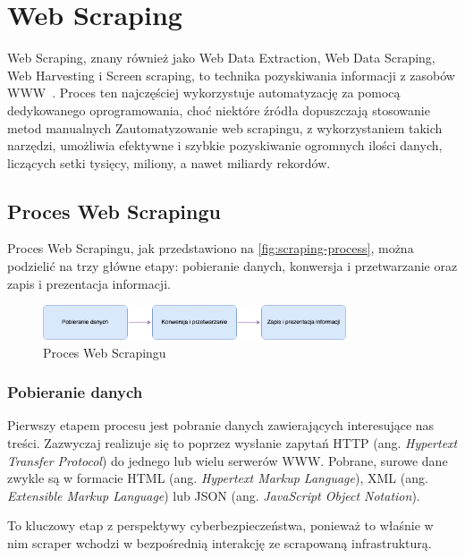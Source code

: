 \newpage


\section{Web Scraping}\label{sec:teoria}

Web Scraping, znany również jako Web Data Extraction, Web Data Scraping, Web Harvesting i Screen scraping, to technika pozyskiwania informacji z zasobów WWW~\cite{Zhao2017}.
Proces ten najczęściej wykorzystuje automatyzację za pomocą dedykowanego oprogramowania, choć niektóre źródła dopuszczają stosowanie metod manualnych\cite{applications-and-tools}
Zautomatyzowanie web scrapingu, z wykorzystaniem takich narzędzi, umożliwia efektywne i szybkie pozyskiwanie ogromnych ilości danych, liczących setki tysięcy, miliony, a nawet miliardy rekordów.

\subsection{Proces Web Scrapingu}\label{subsec:web-scraping-process}

Proces Web Scrapingu, jak przedstawiono na \autoref{fig:scraping-process}, można podzielić na trzy główne etapy: pobieranie danych, konwersja i przetwarzanie oraz zapis i prezentacja informacji\cite{persson}.

\begin{figure}[H]
    \centering
    \includegraphics[width=0.8\textwidth]{img/scraping-process}
    \caption{Proces Web Scrapingu}
    \label{fig:scraping-process}
\end{figure}

\subsubsection{Pobieranie danych}

Pierwszy etapem procesu jest pobranie danych zawierających interesujące nas treści.
Zazwyczaj realizuje się to poprzez wysłanie zapytań HTTP (ang. \emph{Hypertext Transfer Protocol}) do jednego lub wielu serwerów WWW\@.
Pobrane, surowe dane zwykle są w formacie HTML (ang. \emph{Hypertext Markup Language}), XML (ang. \emph{Extensible Markup Language}) lub JSON (ang. \emph{JavaScript Object Notation}).

To kluczowy etap z perspektywy cyberbezpieczeństwa, ponieważ to właśnie w nim scraper wchodzi w bezpośrednią interakcję ze scrapowaną infrastrukturą.

